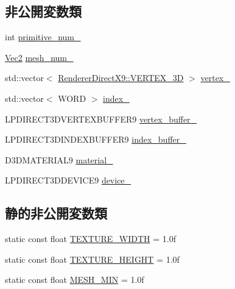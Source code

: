\subsection*{非公開変数類}
\begin{DoxyCompactItemize}
\item 
int \mbox{\hyperlink{class_mesh_plane_polygon_a56aa85d634268bc98a1f7cc144547385}{primitive\+\_\+num\+\_\+}}
\item 
\mbox{\hyperlink{_vector3_d_8h_a5ef6e95dfc5f9d3820b71772d99bbc25}{Vec2}} \mbox{\hyperlink{class_mesh_plane_polygon_ab55f12bf7d9cac682cc53b93a19b0056}{mesh\+\_\+num\+\_\+}}
\item 
std\+::vector$<$ \mbox{\hyperlink{class_renderer_direct_x9_1_1_v_e_r_t_e_x__3_d}{Renderer\+Direct\+X9\+::\+V\+E\+R\+T\+E\+X\+\_\+3D}} $>$ \mbox{\hyperlink{class_mesh_plane_polygon_a9736e54f457231deee711a2310a0ee2a}{vertex\+\_\+}}
\item 
std\+::vector$<$ W\+O\+RD $>$ \mbox{\hyperlink{class_mesh_plane_polygon_ad97af9abf051fc90ab9b9086dbc9a2f9}{index\+\_\+}}
\item 
L\+P\+D\+I\+R\+E\+C\+T3\+D\+V\+E\+R\+T\+E\+X\+B\+U\+F\+F\+E\+R9 \mbox{\hyperlink{class_mesh_plane_polygon_a71ae2d4bea783da57a1b0ec4f6a53971}{vertex\+\_\+buffer\+\_\+}}
\item 
L\+P\+D\+I\+R\+E\+C\+T3\+D\+I\+N\+D\+E\+X\+B\+U\+F\+F\+E\+R9 \mbox{\hyperlink{class_mesh_plane_polygon_a17bd62b6c90611fbbd42cdca17cce573}{index\+\_\+buffer\+\_\+}}
\item 
D3\+D\+M\+A\+T\+E\+R\+I\+A\+L9 \mbox{\hyperlink{class_mesh_plane_polygon_aa6eb3d4fe11c9a123062705cf0f4a19d}{material\+\_\+}}
\item 
L\+P\+D\+I\+R\+E\+C\+T3\+D\+D\+E\+V\+I\+C\+E9 \mbox{\hyperlink{class_mesh_plane_polygon_a58be2f5d0a6f3baf38a515dc8ef201ac}{device\+\_\+}}
\end{DoxyCompactItemize}
\subsection*{静的非公開変数類}
\begin{DoxyCompactItemize}
\item 
static const float \mbox{\hyperlink{class_mesh_plane_polygon_ac30b8ea1330653ced246f68593fbe827}{T\+E\+X\+T\+U\+R\+E\+\_\+\+W\+I\+D\+TH}} = 1.\+0f
\item 
static const float \mbox{\hyperlink{class_mesh_plane_polygon_a749c198188d680d6e6daedc280b12e4e}{T\+E\+X\+T\+U\+R\+E\+\_\+\+H\+E\+I\+G\+HT}} = 1.\+0f
\item 
static const float \mbox{\hyperlink{class_mesh_plane_polygon_a2351cd772fd52db85d339acc35f5acf8}{M\+E\+S\+H\+\_\+\+M\+IN}} = 1.\+0f
\end{DoxyCompactItemize}


